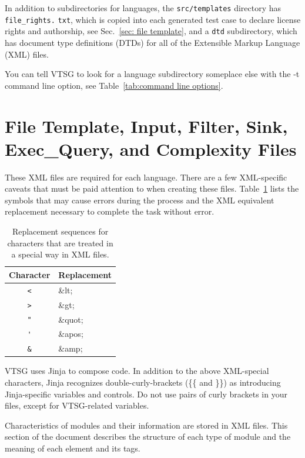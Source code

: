 In addition to subdirectories for languages, the \verb|src/templates| directory
has \verb|file_rights.| \verb|txt|, which is
copied into each generated test case to declare license rights and
authorship, see Sec.~\ref{sec: file template}, and a
\verb|dtd| subdirectory, which has document type definitions (DTDs)
for all of the Extensible Markup Language (XML) files.

\label{sec: alternate template directory}
You can tell VTSG to look for a language subdirectory someplace else with the -t command
line option, see Table~\ref{tab:command line options}.

\section{File Template, Input, Filter, Sink, Exec\_Query, and Complexity Files}
\label{sec:source files}

These XML files are required for each language.
There
are a few XML-specific caveats that must be paid attention to when
creating these files.
Table~\ref{tab:XML escapes} lists the symbols that may cause errors
during the process and the XML equivalent replacement necessary to
complete the
task without error.

\begin{table}[H]
\centering
\caption{Replacement sequences for characters that are treated
in a special way in XML files.}
\begin{tabular}{|c|l|}
\hline
\textbf{Character} & \textbf{Replacement} \\
\hline
 \verb|<| & \&lt; \\
\hline
 \verb|>| & \&gt; \\
\hline
 \verb|"| & \&quot; \\
\hline
 \verb|'| & \&apos; \\
\hline
 \verb|&| & \&amp; \\
\hline
\end{tabular}
\label{tab:XML escapes}
\end{table}

VTSG uses Jinja to compose code. In addition to the above XML-special characters,
Jinja recognizes
double-curly-brackets (\{\{ and \}\}) as introducing Jinja-specific variables and
controls.  Do not use pairs of curly brackets in your files, except for VTSG-related
variables.

Characteristics of modules and their information are stored in 
XML files.  
This section of the document describes the structure of each type of module and
the meaning
of each element and its tags.

